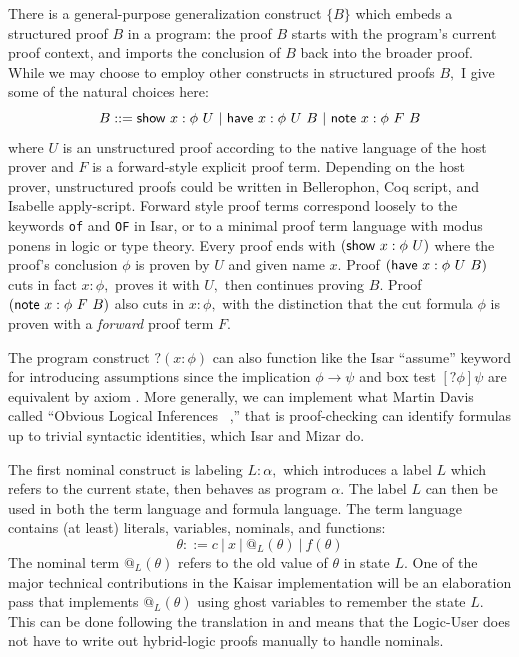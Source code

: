 \documentclass[12pt]{cmuthesis}
\theoremstyle{definition}
\theoremstyle{remark}
\begin{document}
There is a general-purpose generalization construct $\{B\}$ which embeds a structured proof $B$ in a program: the proof $B$ starts with the program's current proof context, and imports the conclusion of $B$ back into the broader proof.
While we may choose to employ other constructs in structured proofs $B,$ I give some of the natural choices here:
\[B ::= \sshow{x}{\phi}{U}\ |\ \shave{x}{\phi}{U}{B}\ |\ \snote{x}{\phi}{F}{B}\]
where $U$ is an unstructured proof according to the native language of the host prover and $F$ is a forward-style explicit proof term.
Depending on the host prover, unstructured proofs could be written in Bellerophon, Coq script, and Isabelle apply-script.
Forward style proof terms correspond loosely to the keywords \texttt{of} and \texttt{OF} in Isar, or to a minimal proof term language with modus ponens in logic or type theory.
Every proof ends with $(\textsf{show}~{x}:{\phi}~{U})$ where the proof's conclusion $\phi$ is proven by $U$ and given name $x$.
Proof $(\textsf{have}~{x}:{\phi}~{U}~{B})$ cuts in fact $x:\phi,$ proves it with $U,$ then continues proving $B$.
Proof $(\textsf{note}~{x}:{\phi}~{F}~{B})$ also cuts in $x:\phi,$ with the distinction that the cut formula $\phi$ is proven with a \emph{forward} proof term $F$.

The program construct $?(x:\phi)$ can also function like the Isar ``assume'' keyword for introducing assumptions since  the implication $\phi \rightarrow \psi$ and box test $[?\phi]\psi$ are equivalent by axiom .
More generally, we can implement what Martin Davis called ``Obvious Logical Inferences~\cite{DBLP:conf/ijcai/Davis81} ,''
 that is proof-checking can identify formulas up to trivial syntactic identities, which Isar and Mizar do.

The first nominal construct is labeling $L: \alpha,$ which introduces a label $L$ which refers to the current state, then behaves as program $\alpha$.
The label $L$ can then be used in both the term language and formula language.
The term language contains (at least) literals, variables, nominals, and functions:
\[\theta ::= c\ |\ x\ |\ @_L(\theta)\ |\ f(\theta)\]
The nominal term $@_L(\theta)$ refers to the old value of $\theta$ in state $L$.
One of the major technical contributions in the Kaisar implementation will be an elaboration pass that implements $@_L(\theta)$ using ghost variables to remember the state $L$.
This can be done following the translation in \cite{DBLP:conf/lics/BohrerP18} and means that the Logic-User does not have to write out hybrid-logic proofs manually to handle nominals.
\end{document}
